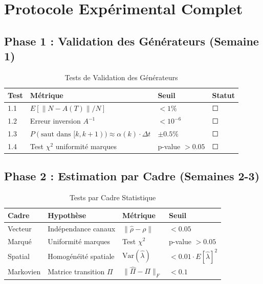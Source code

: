 \documentclass[12pt,a4paper]{article}
\begin{document}
	\section{Protocole Expérimental Complet}
	\label{sec:protocole}
	
	\subsection{Phase 1 : Validation des Générateurs (Semaine 1)}
	\label{subsec:phase1}
	
	\begin{table}[h]
		\centering
		\caption{Tests de Validation des Générateurs}
		\label{tab:tests_generateurs}
		\begin{tabular}{@{}llll@{}}
			\toprule
			\textbf{Test} & \textbf{Métrique} & \textbf{Seuil} & \textbf{Statut} \\
			\midrule
			1.1 & $E[\|N - A(T)\|/N]$ & $< 1\%$ & ☐ \\
			1.2 & Erreur inversion $A^{-1}$ & $< 10^{-6}$ & ☐ \\
			1.3 & $P(\text{saut dans } [k,k+1)) \approx \alpha(k) \cdot \Delta t$ & $\pm 0.5\%$ & ☐ \\
			1.4 & Test $\chi^2$ uniformité marques & p-value $> 0.05$ & ☐ \\
			\bottomrule
		\end{tabular}
	\end{table}
	
	\subsection{Phase 2 : Estimation par Cadre (Semaines 2-3)}
	\label{subsec:phase2}
	
	\begin{table}[h]
		\centering
		\caption{Tests par Cadre Statistique}
		\label{tab:tests_cadres}
		\begin{tabular}{@{}llll@{}}
			\toprule
			\textbf{Cadre} & \textbf{Hypothèse} & \textbf{Métrique} & \textbf{Seuil} \\
			\midrule
			Vecteur & Indépendance canaux & $\|\hat{\rho} - \rho\|$ & $< 0.05$ \\
			Marqué & Uniformité marques & Test $\chi^2$ & p-value $> 0.05$ \\
			Spatial & Homogénéité spatiale & $\text{Var}(\hat{\lambda})$ & $< 0.01 \cdot E[\hat{\lambda}]^2$ \\
			Markovien & Matrice transition $\Pi$ & $\|\hat{\Pi} - \Pi\|_F$ & $< 0.1$ \\
			\bottomrule
		\end{tabular}
	\end{table}
	
\end{document}
